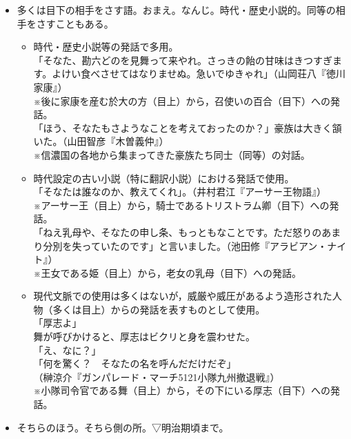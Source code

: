 \documentclass[japanese]{jnlp_1.4}
\newcommand{\MaruOne}{}
\newcommand{\MaruTwo}{}
\begin{document}
\begin{itemize}
\item[\rlap{\MaruOne}]
多くは目下の相手をさす語。おまえ。なんじ。時代・歴史小説的。同等の相手をさすこともある。

\begin{itemize}
\setlength{\fboxsep}{1pt}
\item[\textbullet]
時代・歴史小説等の発話で多用。\\
「\colorbox[gray]{.9}{そなた}、勘六どのを見舞って来やれ。さっきの飴の甘味はきつすぎます。よけい食べさせてはなりませぬ。急いでゆきゃれ」（山岡荘八『徳川家康』）\\
※後に家康を産む於大の方（目上）から，召使いの百合（目下）への発話。\\
「ほう、\colorbox[gray]{.9}{そなた}もさようなことを考えておったのか？」豪族は大きく頷いた。（山田智彦『木曽義仲』）\\
※信濃国の各地から集まってきた豪族たち同士（同等）の対話。

\item[\textbullet]
時代設定の古い小説（特に翻訳小説）における発話で使用。\\
「\colorbox[gray]{.9}{そなた}は誰なのか、教えてくれ」。（井村君江『アーサー王物語』）\\
※アーサー王（目上）から，騎士であるトリストラム卿（目下）への発話。\\
「ねえ乳母や、\colorbox[gray]{.9}{そなた}の申し条、もっともなことです。ただ怒りのあまり分別を失っていたのです」と言いました。（池田修『アラビアン・ナイト』）\\
※王女である姫（目上）から，老女の乳母（目下）への発話。

\item[\textbullet]
現代文脈での使用は多くはないが，威厳や威圧があるよう造形された人物（多くは目上）からの発話を表すものとして使用。\\
「厚志よ」\\
舞が呼びかけると、厚志はビクリと身を震わせた。\\
「え、なに？」\\
「何を驚く？　\colorbox[gray]{.9}{そなた}の名を呼んだだけだぞ」\\
（榊涼介『ガンパレード・マーチ5121小隊九州撤退戦』）\\
※小隊司令官である舞（目上）から，その下にいる厚志（目下）への発話。
\end{itemize}

\item[\rlap{\MaruTwo}]そちらのほう。そちら側の所。▽明治期頃まで。


\end{itemize}
\end{document}
